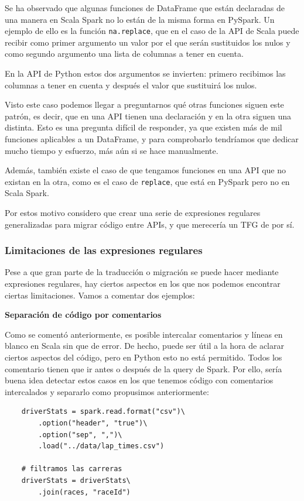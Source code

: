 \documentclass[12pt,twoside,titlepage]{report}
\begin{document}
Se ha observado que algunas funciones de DataFrame que están declaradas de una manera en Scala Spark no lo están de la misma forma en PySpark. Un ejemplo de ello es la función \texttt{na.replace}, que en el caso de la API de Scala puede recibir como primer argumento un valor por el que serán sustituidos los nulos y como segundo argumento una lista de columnas a tener en cuenta.

En la API de Python estos dos argumentos se invierten: primero recibimos las columnas a tener en cuenta y después el valor que sustituirá los nulos.

Visto este caso podemos llegar a preguntarnos qué otras funciones siguen este patrón, es decir, que en una API tienen una declaración y en la otra siguen una distinta. Esto es una pregunta difícil de responder, ya que existen más de mil funciones aplicables a un DataFrame, y para comprobarlo tendríamos que dedicar mucho tiempo y esfuerzo, más aún si se hace manualmente.

Además, también existe el caso de que tengamos funciones en una API que no existan en la otra, como es el caso de \texttt{replace}, que está en PySpark pero no en Scala Spark.

Por estos motivo considero que crear una serie de expresiones regulares generalizadas para migrar código entre APIs, y que merecería un TFG de por sí.

\subsubsection{Limitaciones de las expresiones regulares}

Pese a que gran parte de la traducción o migración se puede hacer mediante expresiones regulares, hay ciertos aspectos en los que nos podemos encontrar ciertas limitaciones. Vamos a comentar dos ejemplos:

\textbf{Separación de código por comentarios}

Como se comentó anteriormente, es posible intercalar comentarios y líneas en blanco en Scala sin que de error. De hecho, puede ser útil a la hora de aclarar ciertos aspectos del código, pero en Python esto no está permitido. Todos los comentario tienen que ir antes o después de la query de Spark. Por ello, sería buena idea detectar estos casos en los que tenemos código con comentarios intercalados y separarlo como propusimos anteriormente:

\begin{lstlisting}
	driverStats = spark.read.format("csv")\
		.option("header", "true")\
		.option("sep", ",")\
		.load("../data/lap_times.csv")
	
	# filtramos las carreras
	driverStats = driverStats\
		.join(races, "raceId")
\end{lstlisting}
\end{document}
